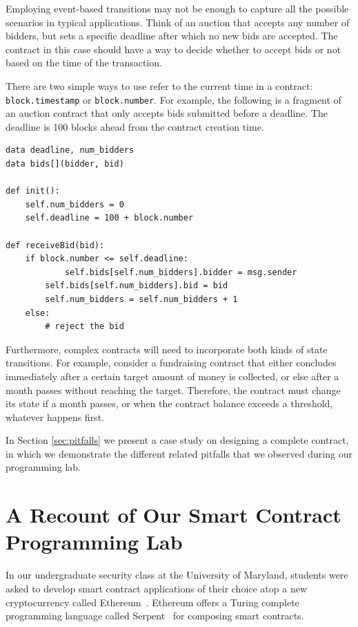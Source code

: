 \documentclass{llncs}
\newcommand{\elaine}[1]{}
\begin{document}
{Employing event-based transitions may not be enough to capture all the possible scenarios in typical applications. Think of an auction that accepts any number of bidders, but sets a specific deadline after which no new bids are accepted. The contract in this case should have a way to decide whether to accept bids or not based on the time of the transaction.

There are two simple ways to use refer to the current time in a contract: \texttt{block.timestamp} or \texttt{block.number}. For example, the following is a fragment of an auction contract that only accepts bids submitted before a deadline. The deadline is 100 blocks ahead from the contract creation time.

\begin{mdframed}
\begin{verbatim}
data deadline, num_bidders
data bids[](bidder, bid)

def init():
	self.num_bidders = 0
	self.deadline = 100 + block.number                

def receiveBid(bid):
	if block.number <= self.deadline:
    		self.bids[self.num_bidders].bidder = msg.sender
		self.bids[self.num_bidders].bid = bid
		self.num_bidders = self.num_bidders + 1
	else:
		# reject the bid
\end{verbatim}
\end{mdframed}                

Furthermore, complex contracts will need to incorporate both kinds of state transitions. For example, consider a fundraising contract that either concludes immediately after a certain target amount of money is collected, or else after a month passes without reaching the target. Therefore, the contract must change its state if a month passes, or when the contract balance exceeds a threshold, whatever happens first.

In Section \ref{sec:pitfalls} we present a case study on designing a complete contract, in which we demonstrate the different related pitfalls that we observed during our programming lab.
}

\section{A Recount of Our Smart Contract Programming Lab}
\label{sec:lab}
In our undergraduate security class at the University of Maryland, %
students were asked to develop smart contract applications of their choice
atop a new cryptocurrency called Ethereum~\cite{ethereum}. %
Ethereum offers a Turing complete programming language
called Serpent~\cite{serpent} for composing smart contracts. 
\end{document}
